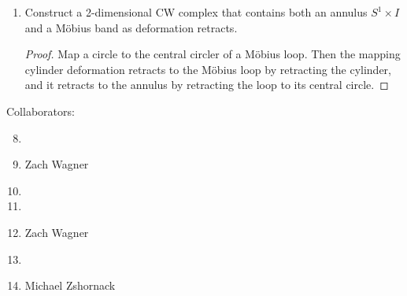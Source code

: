 \documentclass[12pt,letterpaper]{article}
\begin{document}
\begin{enumerate}
\begin{enumerate}[label=(\alph*)]
	\item  Construct a 2-dimensional CW complex that contains both an annulus $S^1\times I$ and a M\"{o}bius band as deformation retracts. 
	\begin{proof}
	Map a circle to the central circler of a M\"obius loop. Then the mapping cylinder deformation retracts to the M\"obius loop by retracting the cylinder, and it retracts to the annulus by retracting the loop to its central circle.
	 
	\end{proof}
	\end{enumerate}


\end{enumerate}

\vfill

Collaborators:
\begin{enumerate}
\setcounter{enumi}{7}
\item 

\item Zach Wagner

\item

\item

\item Zach Wagner

\setcounter{enumi}{13}
\item 

\setcounter{enumi}{16}
\item Michael Zshornack
\end{enumerate}
\end{document}
